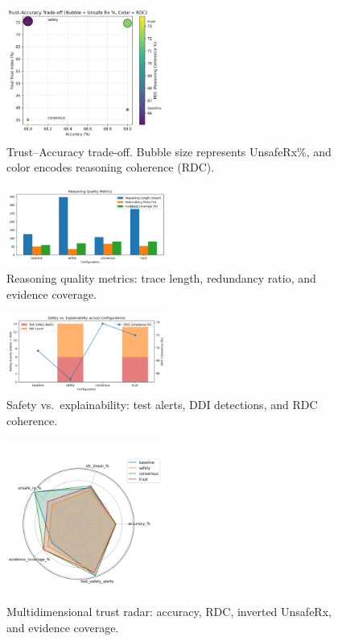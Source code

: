 \documentclass[letterpaper]{article} %
\begin{document}
\begin{figure}[t]
\centering
\includegraphics[width=0.47\textwidth]{fig2_trust_accuracy_tradeoff.png}
\caption{Trust--Accuracy trade-off. Bubble size represents UnsafeRx\%, and color encodes reasoning coherence (RDC).}
\label{fig:bubble_tradeoff}
\end{figure}

\begin{figure}[t]
\centering
\includegraphics[width=0.47\textwidth]{fig3_reasoning_quality.png}
\caption{Reasoning quality metrics: trace length, redundancy ratio, and evidence coverage.}
\label{fig:reasoning_quality}
\end{figure}

\begin{figure}[t]
\centering
\includegraphics[width=0.47\textwidth]{fig4_safety_vs_explainability.png}
\caption{Safety vs.\ explainability: test alerts, DDI detections, and RDC coherence.}
\label{fig:safety_explainability}
\end{figure}

\begin{figure}[t]
\centering
\includegraphics[width=0.47\textwidth]{fig5_trust_radar.png}
\caption{Multidimensional trust radar: accuracy, RDC, inverted UnsafeRx, and evidence coverage.}
\label{fig:trust_radar}
\end{figure}
\end{document}
